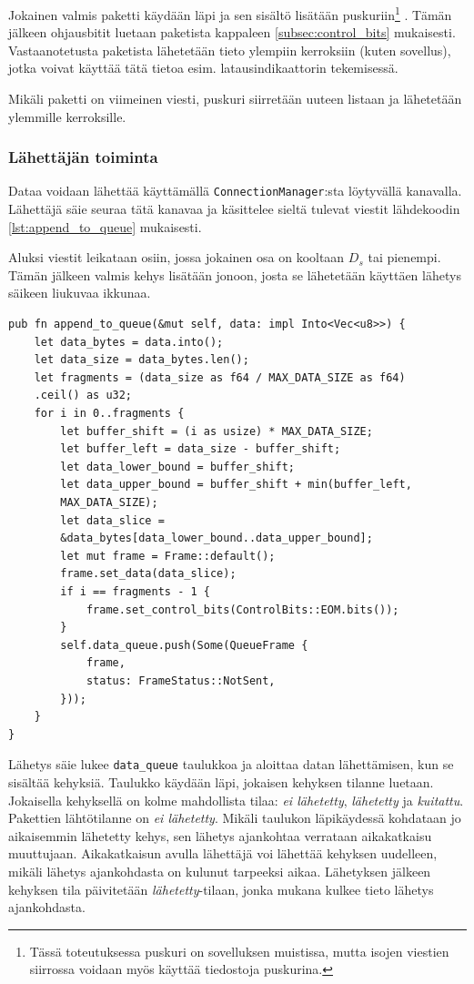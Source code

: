 \documentclass[a4paper,12pt]{article}
\begin{document}
    Jokainen valmis paketti käydään läpi ja sen sisältö lisätään puskuriin\footnote{Tässä toteutuksessa puskuri on sovelluksen muistissa, mutta isojen viestien siirrossa voidaan myös käyttää tiedostoja puskurina.}
    . Tämän jälkeen ohjausbitit luetaan paketista kappaleen \ref{subsec:control_bits} mukaisesti. Vastaanotetusta paketista lähetetään tieto ylempiin kerroksiin (kuten sovellus), jotka voivat käyttää tätä tietoa esim. latausindikaattorin tekemisessä. \par

    Mikäli paketti on viimeinen viesti, puskuri siirretään uuteen listaan ja lähetetään ylemmille kerroksille.

    \subsubsection{Lähettäjän toiminta}\label{subsec:sender_impl}
    Dataa voidaan lähettää käyttämällä \lstinline{ConnectionManager}:sta löytyvällä kanavalla. Lähettäjä säie seuraa tätä kanavaa ja käsittelee sieltä tulevat viestit lähdekoodin \ref{lst:append_to_queue} mukaisesti. \par

    Aluksi viestit leikataan osiin, jossa jokainen osa on kooltaan $D_s$ tai pienempi. Tämän jälkeen valmis kehys lisätään jonoon, josta se lähetetään käyttäen lähetys säikeen liukuvaa ikkunaa.
    
    \begin{lstlisting}[caption={Datan käsittely lähettämistä varten}, label={lst:append_to_queue}]
pub fn append_to_queue(&mut self, data: impl Into<Vec<u8>>) {
    let data_bytes = data.into();
    let data_size = data_bytes.len();
    let fragments = (data_size as f64 / MAX_DATA_SIZE as f64)
    .ceil() as u32;
    for i in 0..fragments {
        let buffer_shift = (i as usize) * MAX_DATA_SIZE;
        let buffer_left = data_size - buffer_shift;
        let data_lower_bound = buffer_shift;
        let data_upper_bound = buffer_shift + min(buffer_left,
        MAX_DATA_SIZE);
        let data_slice =
        &data_bytes[data_lower_bound..data_upper_bound];
        let mut frame = Frame::default();
        frame.set_data(data_slice);
        if i == fragments - 1 {
            frame.set_control_bits(ControlBits::EOM.bits());
        }
        self.data_queue.push(Some(QueueFrame {
            frame,
            status: FrameStatus::NotSent,
        }));
    }
}
\end{lstlisting}
 
Lähetys säie lukee \lstinline{data_queue} taulukkoa ja aloittaa datan lähettämisen, kun se sisältää kehyksiä. Taulukko käydään läpi, jokaisen kehyksen tilanne luetaan. Jokaisella kehyksellä on kolme mahdollista tilaa: \textit{ei lähetetty}, \textit{lähetetty} ja \textit{kuitattu}. Pakettien lähtötilanne on \textit{ei lähetetty}. Mikäli taulukon läpikäydessä kohdataan jo aikaisemmin lähetetty kehys, sen lähetys ajankohtaa verrataan aikakatkaisu muuttujaan. Aikakatkaisun avulla lähettäjä voi lähettää kehyksen uudelleen, mikäli lähetys ajankohdasta on kulunut tarpeeksi aikaa. Lähetyksen jälkeen kehyksen tila päivitetään \textit{lähetetty}-tilaan, jonka mukana kulkee tieto lähetys ajankohdasta. \par
\end{document}

